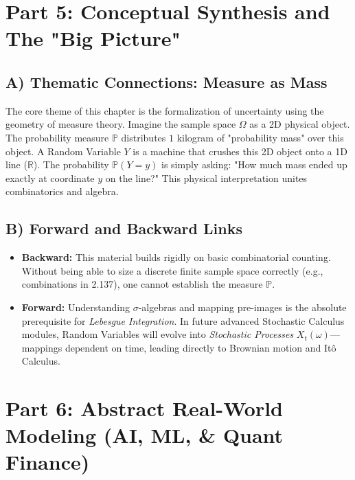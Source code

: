 \documentclass[11pt, letterpaper]{article}
\theoremstyle{definition}
\newcommand{\R}{\mathbb{R}}
\renewcommand{\P}{\mathbb{P}}
\begin{document}
\section{Part 5: Conceptual Synthesis and The "Big Picture"}

\subsection{A) Thematic Connections: Measure as Mass}
The core theme of this chapter is the formalization of uncertainty using the geometry of measure theory. Imagine the sample space $\Omega$ as a 2D physical object. The probability measure $\P$ distributes $1$ kilogram of "probability mass" over this object. A Random Variable $Y$ is a machine that crushes this 2D object onto a 1D line ($\R$). The probability $\P(Y = y)$ is simply asking: "How much mass ended up exactly at coordinate $y$ on the line?" This physical interpretation unites combinatorics and algebra.

\subsection{B) Forward and Backward Links}
\begin{itemize}
    \item \textbf{Backward:} This material builds rigidly on basic combinatorial counting. Without being able to size a discrete finite sample space correctly (e.g., combinations in 2.137), one cannot establish the measure $\P$.
    \item \textbf{Forward:} Understanding $\sigma$-algebras and mapping pre-images is the absolute prerequisite for \textit{Lebesgue Integration}. In future advanced Stochastic Calculus modules, Random Variables will evolve into \textit{Stochastic Processes} $X_t(\omega)$—mappings dependent on time, leading directly to Brownian motion and It\^o Calculus.
\end{itemize}

\section{Part 6: Abstract Real-World Modeling (AI, ML, \& Quant Finance)}
\end{document}
